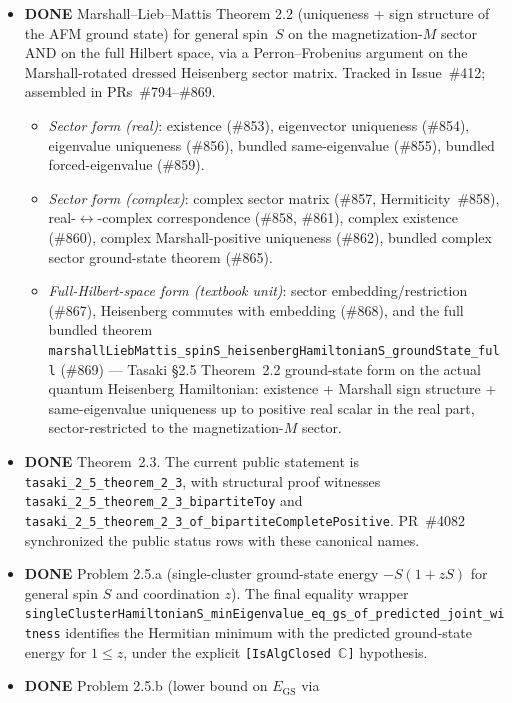 \documentclass[a4paper,11pt]{article}
\begin{document}
\begin{itemize}
\item \textbf{DONE} Marshall--Lieb--Mattis Theorem 2.2 (uniqueness + sign
  structure of the AFM ground state) for general spin~$S$ on the
  magnetization-$M$ sector AND on the full Hilbert space, via a
  Perron--Frobenius argument on the Marshall-rotated dressed
  Heisenberg sector matrix. Tracked in Issue~\#412; assembled in
  PRs~\#794--\#869.
  \begin{itemize}
  \item \emph{Sector form (real)}: existence (\#853), eigenvector
    uniqueness (\#854), eigenvalue uniqueness (\#856), bundled
    same-eigenvalue (\#855), bundled forced-eigenvalue (\#859).
  \item \emph{Sector form (complex)}: complex sector matrix (\#857,
    Hermiticity~\#858), real-$\leftrightarrow$-complex
    correspondence (\#858, \#861), complex existence (\#860),
    complex Marshall-positive uniqueness (\#862), bundled complex
    sector ground-state theorem (\#865).
  \item \emph{Full-Hilbert-space form (textbook unit)}: sector
    embedding/restriction (\#867), Heisenberg commutes with
    embedding (\#868), and the full bundled theorem
    \texttt{marshallLiebMattis\_spinS\_heisenbergHamiltonianS\_groundState\_full}
    (\#869) — Tasaki §2.5 Theorem~2.2 ground-state form on the
    actual quantum Heisenberg Hamiltonian: existence + Marshall sign
    structure + same-eigenvalue uniqueness up to positive real
    scalar in the real part, sector-restricted to the
    magnetization-$M$ sector.
  \end{itemize}
\item \textbf{DONE} Theorem~2.3.  The current public statement is
  \texttt{tasaki\_2\_5\_theorem\_2\_3}, with structural proof witnesses
  \texttt{tasaki\_2\_5\_theorem\_2\_3\_bipartiteToy} and
  \texttt{tasaki\_2\_5\_theorem\_2\_3\_of\_bipartiteCompletePositive}.
  PR~\#4082 synchronized the public status rows with these canonical names.
\item \textbf{DONE} Problem 2.5.a (single-cluster ground-state energy
  $-S(1+zS)$ for general spin $S$ and coordination $z$).  The final
  equality wrapper
  \texttt{singleClusterHamiltonianS\_minEigenvalue\_eq\_gs\_of\_predicted\_joint\_witness}
  identifies the Hermitian minimum with the predicted ground-state energy for
  $1\le z$, under the explicit \texttt{[IsAlgClosed \(\mathbb C\)]}
  hypothesis.
\item \textbf{DONE} Problem 2.5.b (lower bound on $E_{\mathrm{GS}}$ via

\end{itemize}
\end{document}
